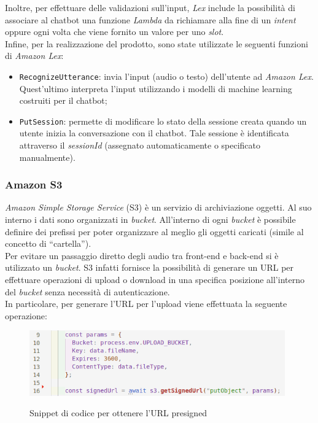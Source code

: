 		\noindent Inoltre, per effettuare delle validazioni sull'input, \emph{Lex} include la possibilità di associare al \gls{chatbot} una funzione \emph{Lambda} da richiamare alla fine di un \emph{intent} oppure ogni volta che viene fornito un valore per uno \emph{slot}. \\
		
		\noindent Infine, per la realizzazione del prodotto, sono state utilizzate le seguenti funzioni di \emph{Amazon Lex}:
		\begin{itemize}
			\item \texttt{RecognizeUtterance}: invia l'input (audio o testo) dell'utente ad \emph{Amazon Lex}. Quest'ultimo interpreta l'input utilizzando i modelli di machine learning costruiti per il \gls{chatbot};
			
			\item \texttt{PutSession}: permette di modificare lo stato della sessione creata quando un utente inizia la conversazione con il \gls{chatbot}. Tale sessione è identificata attraverso il \emph{sessionId} (assegnato automaticamente o specificato manualmente). 
		\end{itemize}
		
		\subsubsection{Amazon S3}
		\emph{Amazon Simple Storage Service} (S3) è un servizio di archiviazione oggetti. Al suo interno i dati sono 
		organizzati in \emph{bucket}. All'interno di ogni \emph{bucket} è possibile definire dei prefissi per poter 
		organizzare al meglio gli oggetti caricati (simile al concetto di ``cartella''). \\ 
		Per evitare un passaggio diretto degli audio tra front-end e back-end si è utilizzato un \emph{bucket}. S3 
		infatti fornisce la possibilità di generare un URL per effettuare operazioni di upload o 
		download in una specifica posizione all'interno del \emph{bucket} senza necessità di autenticazione. \\ 
		In particolare, per generare l'URL per l'upload viene effettuata la seguente operazione:
		
		\begin{figure}[H]
			\centering
			\includegraphics[width=11cm]{immagini/getURL.png} \\
			\caption{\label{fig:getURLAudio} Snippet di codice per ottenere l'URL presigned}
		\end{figure}
		
